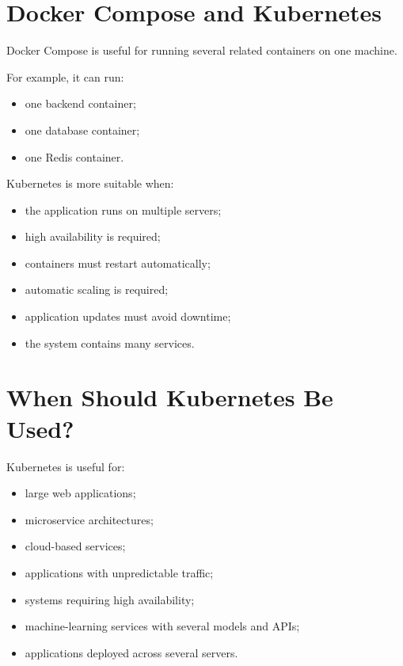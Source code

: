 \documentclass[a4paper]{article}
\begin{document}
    
    \section{Docker Compose and Kubernetes}
        
        Docker Compose is useful for running several related containers on one
        machine.
        
        For example, it can run:
        
        \begin{itemize}
            \item one backend container;
            \item one database container;
            \item one Redis container.
        \end{itemize}
        
        Kubernetes is more suitable when:
        
        \begin{itemize}
            \item the application runs on multiple servers;
            \item high availability is required;
            \item containers must restart automatically;
            \item automatic scaling is required;
            \item application updates must avoid downtime;
            \item the system contains many services.
        \end{itemize}
    
    
    \section{When Should Kubernetes Be Used?}
        
        Kubernetes is useful for:
        
        \begin{itemize}
            \item large web applications;
            \item microservice architectures;
            \item cloud-based services;
            \item applications with unpredictable traffic;
            \item systems requiring high availability;
            \item machine-learning services with several models and APIs;
            \item applications deployed across several servers.
        \end{itemize}
        
\end{document}
